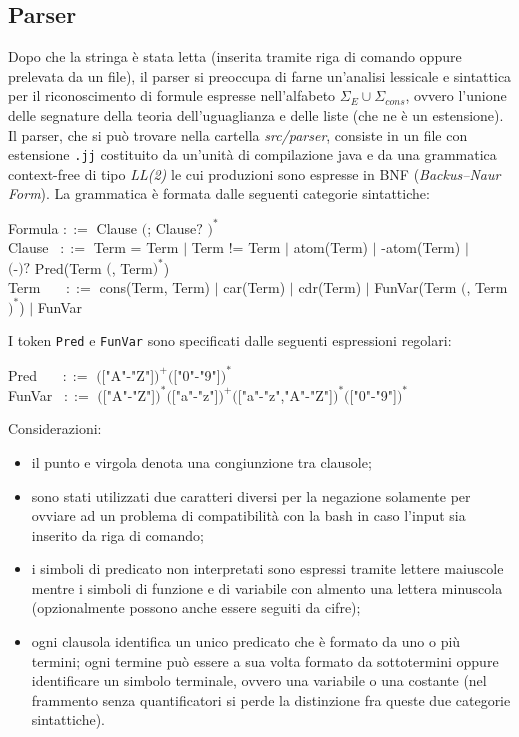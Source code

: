 \documentclass[a4paper,11pt]{article}
\newcommand{\grammarindent}[1][1]{\hspace*{#1\parindent}\ignorespaces}
\begin{document}
\subsection{Parser}
Dopo che la stringa è stata letta (inserita tramite riga di comando 
oppure prelevata da un file), il parser si preoccupa di farne un'analisi 
lessicale e sintattica per il riconoscimento di formule espresse 
nell'alfabeto $\Sigma_{E}\cup\Sigma_{cons}$, ovvero l'unione delle 
segnature della teoria dell'uguaglianza e delle liste (che ne è un 
estensione).\\
Il parser, che si può trovare nella cartella \emph{src/parser}, consiste 
in un file con estensione \texttt{.jj} costituito da un'unità di 
compilazione java e da una grammatica context-free di tipo \emph{LL(2)} 
le cui produzioni sono espresse in BNF (\emph{Backus–Naur Form}).
La grammatica è formata dalle seguenti categorie sintattiche: \\[1mm]
\begin{ttfamily}
\grammarindent Formula $::=$  Clause $($; Clause$?$ $)^*$ \\
\grammarindent Clause~ $::=$ Term = Term $|$ Term != Term $|$ atom(Term) $|$ -atom(Term) $|$ \\
\grammarindent[8] $($-$)?$ Pred(Term $($, Term$)^*$)\\
\grammarindent Term~~~ $::=$ cons(Term, Term) $|$ car(Term) $|$ cdr(Term) $|$ FunVar(Term $($, Term$)^*$) $|$ FunVar \\[1mm]
\end{ttfamily}
I token \texttt{Pred} e \texttt{FunVar} sono specificati dalle 
seguenti espressioni regolari:\\[1mm]
\begin{ttfamily}
\grammarindent Pred~~~ $::=$ $($["A"-"Z"]$)^+($["0"-"9"]$)^*$\\
\grammarindent FunVar~ $::=$ $($["A"-"Z"]$)^*($["a"-"z"]$)^+($["a"-"z","A"-"Z"]$)^*($["0"-"9"]$)^*$\\[1.5mm]
\end{ttfamily}
\noindent Considerazioni:
\begin{itemize}
\item il punto e virgola denota una congiunzione tra clausole;
\item sono stati utilizzati due caratteri diversi per la negazione 
solamente per ovviare ad un problema di compatibilità con la bash in caso 
l'input sia inserito da riga di comando; 
\item i simboli di predicato non interpretati sono espressi tramite 
lettere maiuscole mentre i simboli di funzione e di variabile con almento 
una lettera minuscola (opzionalmente possono anche essere seguiti da 
cifre);
\item ogni clausola identifica un unico predicato che è formato da uno o 
più termini; ogni termine può essere a sua volta formato da sottotermini 
oppure identificare un simbolo terminale, ovvero una variabile o una costante 
(nel frammento senza quantificatori si perde la distinzione fra queste due 
categorie sintattiche).
\end{itemize}
\end{document}
